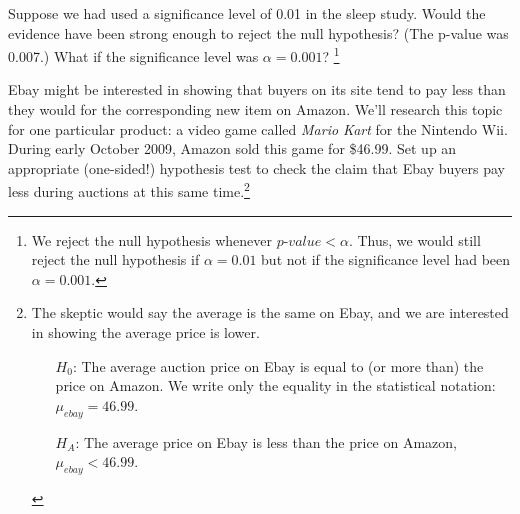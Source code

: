 \begin{exercise}
Suppose we had used a significance level of 0.01 in the sleep study. Would the evidence have been strong enough to reject the null hypothesis? (The p-value was 0.007.) What if the significance level was $\alpha = 0.001$? \footnote{We reject the null hypothesis whenever $p$-$value < \alpha$. Thus, we would still reject the null hypothesis if $\alpha = 0.01$ but not if the significance level had been $\alpha = 0.001$.}
\end{exercise}

\begin{exercise} \label{ebayAmazonOneSidedTestExercise}
Ebay might be interested in showing that buyers on its site tend to pay less than they would for the corresponding new item on Amazon. We'll research this topic for one particular product: a video game called \emph{Mario Kart} for the Nintendo Wii. During early October 2009, Amazon sold this game for \$46.99. Set up an appropriate (one-sided!) hypothesis test to check the claim that Ebay buyers pay less during auctions at this same time.\footnote{The skeptic would say the average is the same on Ebay, and we are interested in showing the average price is lower.
\begin{itemize}
\setlength{\itemsep}{0mm}
\item[$H_0$:] The average auction price on Ebay is equal to (or more than) the price on Amazon. We write only the equality in the statistical notation: $\mu_{ebay} = 46.99$.
\item[$H_A$:] The average price on Ebay is less than the price on Amazon, $\mu_{ebay} < 46.99$.
\end{itemize}}
\end{exercise}



